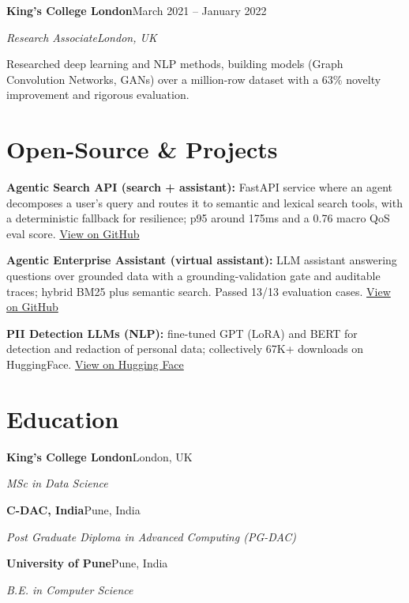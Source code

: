 \documentclass[10pt,a4paper]{article}
\newcommand{\entry}[4]{%
  {\color{company}\bfseries #1}\hfill {\color{muted}#2}\par
  \vspace{1pt}
  {\itshape #3}\hfill {\color{muted}\itshape #4}\par
  \vspace{3pt}%
}
\begin{document}
\entry{King's College London}{March 2021 -- January 2022}{Research Associate}{London, UK}
\begin{tight}
  \item Researched deep learning and NLP methods, building models (Graph Convolution Networks, GANs) over a million-row dataset with a 63\% novelty improvement and rigorous evaluation.
\end{tight}

\section{Open-Source \& Projects}
\begin{tight}
  \item \textbf{Agentic Search API (search + assistant):} FastAPI service where an agent decomposes a user's query and routes it to semantic and lexical search tools, with a deterministic fallback for resilience; p95 around 175ms and a 0.76 macro QoS eval score. \href{https://github.com/abhijeetscode/search-agent}{View on GitHub}
  \item \textbf{Agentic Enterprise Assistant (virtual assistant):} LLM assistant answering questions over grounded data with a grounding-validation gate and auditable traces; hybrid BM25 plus semantic search. Passed 13/13 evaluation cases. \href{https://github.com/abhijeetscode/Agentic-Enterprise-Assistant}{View on GitHub}
  \item \textbf{PII Detection LLMs (NLP):} fine-tuned GPT (LoRA) and BERT for detection and redaction of personal data; collectively 67K+ downloads on HuggingFace. \href{https://huggingface.co/ab-ai/pii_model}{View on Hugging Face}
\end{tight}

\section{Education}
{\color{company}\bfseries King's College London}\hfill {\color{muted}London, UK}\par
{\itshape MSc in Data Science}\par\vspace{2pt}
{\color{company}\bfseries C-DAC, India}\hfill {\color{muted}Pune, India}\par
{\itshape Post Graduate Diploma in Advanced Computing (PG-DAC)}\par\vspace{2pt}
{\color{company}\bfseries University of Pune}\hfill {\color{muted}Pune, India}\par
{\itshape B.E. in Computer Science}\par
\end{document}
